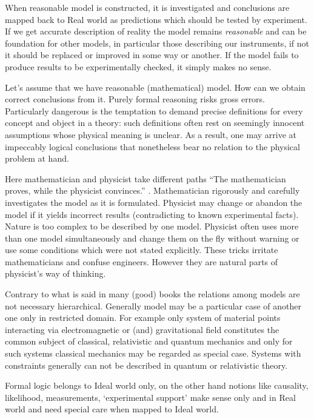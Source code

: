  When reasonable model is constructed, 
it is investigated and conclusions are mapped back to Real world as predictions which 
should be tested by  experiment. 
If we get  accurate description of reality the model remains {\em reasonable} and can be foundation 
for other models, in particular those describing our instruments, if not it  should be replaced or improved in some way or another.
If the model fails to produce results to be experimentally checked, it simply makes no sense.

Let's assume that we have reasonable (mathematical) model. How can
we obtain correct conclusions from it. 
Purely formal reasoning risks gross errors. 
Particularly dangerous is the temptation to demand precise  definitions for every concept and object in a theory: such definitions often rest on seemingly innocent assumptions 
whose physical meaning is unclear. As a result, one may arrive at impeccably logical conclusions that nonetheless bear no relation to the physical problem at hand.

Here mathematician
and physicist take different paths “The mathematician proves, while the physicist convinces.” \cite{Medvedev}. Mathematician rigorously
and carefully investigates the model as it is formulated.
Physicist may change or abandon the model if it yields 
 incorrect results (contradicting to known experimental facts).
Nature is too complex to be described by one model.
Physicist often uses more than one model simultaneously and change them on the fly 
without warning or use some conditions which were not stated explicitly. 
These tricks irritate mathematicians and confuse engineers. However they are natural parts of 
physicist's way of thinking. 

Contrary to what is said in many (good) books the relations 
among models are not necessary hierarchical. Generally model may be a particular case of another one only in restricted domain. 
For example only system of material points interacting via electromagnetic or (and) gravitational
field constitutes the common subject of classical, relativistic and quantum mechanics and only for such systems classical mechanics may be regarded as special case. Systems with constraints generally can not be described in quantum or relativistic theory.

Formal logic belongs to Ideal world only, on the other hand notions like causality,  likelihood, measurements,
`experimental support' make sense only and in Real world and need 
special care when mapped to Ideal world. 

